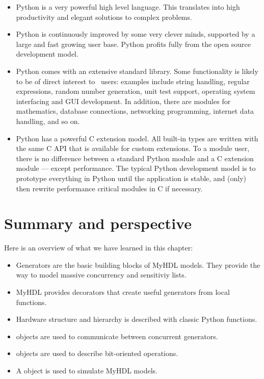 \begin{itemize}

\item Python is a very powerful high level language. This translates
into high productivity and elegant solutions to complex problems.

\item Python is continuously improved by some very clever 
minds, supported by a large and fast growing user base. Python profits
fully from the open source development model.

\item Python comes with an extensive standard library. Some
functionality is likely to be of direct interest to \myhdl\ users:
examples include string handling, regular expressions, random number
generation, unit test support, operating system interfacing and GUI
development. In addition, there are modules for mathematics, database
connections, networking programming, internet data handling, and so
on.

\item Python has a powerful C extension model. All built-in types are
written with the same C API that is available for custom
extensions. To a module user, there is no difference between a
standard Python module and a C extension module --- except
performance. The typical Python development model is to prototype
everything in Python until the application is stable, and (only) then
rewrite performance critical modules in C if necessary.

\end{itemize}


\section{Summary and perspective \label{intro-summary}}
Here is an overview of what we have learned in this chapter:

\begin{itemize}
\item Generators are the basic building blocks of MyHDL models. They
provide the way to model massive concurrency and sensitiviy lists.

\item MyHDL provides decorators that create useful generators from local functions.

\item Hardware structure and hierarchy is described with classic Python functions. 

\item {} objects are used to communicate between concurrent generators.

\item {} objects are used to describe bit-oriented operations.

\item A  object is used to simulate MyHDL models.
\end{itemize}

